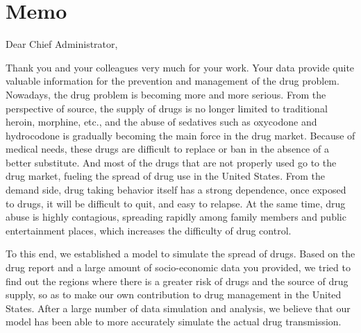 \documentclass{mcmthesis}
\begin{document}
\clearpage

\section{Memo}

\noindent Dear Chief Administrator,

Thank you and your colleagues very much for your work. Your data provide quite valuable information for the prevention and management of the drug problem. Nowadays, the drug problem is becoming more and more serious. From the perspective of source, the supply of drugs is no longer limited to traditional heroin, morphine, etc., and the abuse of sedatives such as oxycodone and hydrocodone is gradually becoming the main force in the drug market. Because of medical needs, these drugs are difficult to replace or ban in the absence of a better substitute. And most of the drugs that are not properly used go to the drug market, fueling the spread of drug use in the United States. From the demand side, drug taking behavior itself has a strong dependence, once exposed to drugs, it will be difficult to quit, and easy to relapse. At the same time, drug abuse is highly contagious, spreading rapidly among family members and public entertainment places, which increases the difficulty of drug control.\par

To this end, we established a model to simulate the spread of drugs. Based on the drug report and a large amount of socio-economic data you provided, we tried to find out the regions where there is a greater risk of drugs and the source of drug supply, so as to make our own contribution to drug management in the United States. After a large number of data simulation and analysis, we believe that our model has been able to more accurately simulate the actual drug transmission. \par
\end{document}
